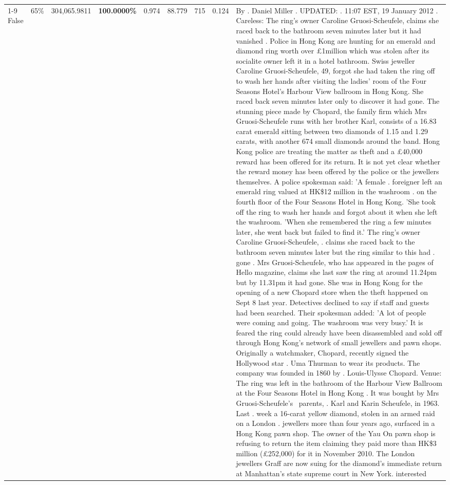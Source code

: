 \begin{table}[H]
\begin{tabular}{lllrlllll}
\cline{1-9} \cline{2-9}
False & 65\% & \color{red} 304,065.9811 & \bfseries \color{red} 100.0000\% & 0.974 & 88.779 & 715 & 0.124 & By . Daniel Miller . UPDATED: . 11:07 EST, 19 January 2012 . Careless: The ring's owner Caroline Gruosi-Scheufele, claims she raced back to the bathroom seven minutes later but it had vanished . Police in Hong Kong are hunting for an emerald and diamond ring worth over £1million which was stolen after its socialite owner left it in a hotel bathroom. Swiss jeweller Caroline Gruosi-Scheufele, 49, forgot she had taken the ring off to wash her hands after visiting the ladies' room of the Four Seasons Hotel's Harbour View ballroom in Hong Kong. She raced back seven minutes later only to discover it had gone. The stunning piece made by Chopard, the family firm which Mrs Gruosi-Scheufele runs with her brother Karl, consists of a 16.83 carat emerald sitting between two diamonds of 1.15 and 1.29 carats, with another 674 small diamonds around the band. Hong Kong police are treating the matter as theft and a £40,000 reward has been offered for its return. It is not yet clear whether the reward money has been offered by the police or the jewellers themselves. A police spokesman said: 'A female . foreigner left an emerald ring valued at HK\$12 million in the washroom . on the fourth floor of the Four Seasons Hotel in Hong Kong. 'She took off the ring to wash her hands and forgot about it when she left the washroom. 'When she remembered the ring a few minutes later, she went back but failed to find it.' The ring's owner Caroline Gruosi-Scheufele, . claims she raced back to the bathroom seven minutes later but the ring similar to this had . gone . Mrs Gruosi-Scheufele, who has appeared in the pages of Hello magazine, claims she last saw the ring at around 11.24pm but by 11.31pm it had gone. She was in Hong Kong for the opening of a new Chopard store when the theft happened on Sept 8 last year. Detectives declined to say if staff and guests had been searched. Their spokesman added: 'A lot of people were coming and going. The washroom was very busy.' It is feared the ring could already have been disassembled and sold off through Hong Kong's network of small jewellers and pawn shops. Originally a watchmaker, Chopard, recently signed the Hollywood star . Uma Thurman to wear its products. The company was founded in 1860 by . Louis-Ulysse Chopard. Venue: The ring was left in the bathroom of the Harbour View Ballroom at the Four Seasons Hotel in Hong Kong . It was bought by Mrs Gruosi-Scheufele's  parents, . Karl and Karin Scheufele, in 1963. Last . week a 16-carat yellow diamond, stolen in an armed raid on a London . jewellers more than four years ago, surfaced in a Hong Kong pawn shop. The owner of the Yau On pawn shop is refusing to return the item claiming they paid more than HK\$3 million (£252,000) for it in November 2010. The London jewellers Graff are now suing for the diamond’s immediate return at Manhattan’s state supreme court in New York. interested \\

\end{tabular}
\end{table}
